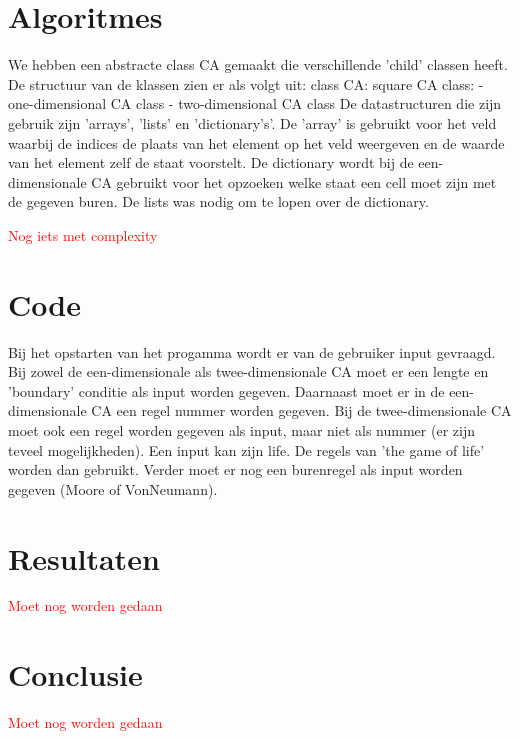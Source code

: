 \documentclass[12pt,a4paper]{article}
\begin{document}
\section*{Algoritmes}
We hebben een abstracte class CA gemaakt die verschillende 'child' classen heeft.
\newline
De structuur van de klassen zien er als volgt uit:
\newline
\phantom{.}class CA:
\newline
\phantom{.}\hspace{12pt}square CA class:
\newline
\phantom{.}\hspace{24pt}- one-dimensional CA class
\newline
\phantom{.}\hspace{24pt}- two-dimensional CA class
\vspace{6pt}
\newline
De datastructuren die zijn gebruik zijn 'arrays', 'lists' en 'dictionary's'. 
De 'array' is gebruikt voor het veld waarbij de indices de plaats van het element op het veld weergeven en 
de waarde van het element zelf de staat voorstelt.
De dictionary wordt bij de een-dimensionale CA gebruikt voor het opzoeken welke staat een cell moet zijn met de gegeven buren.
De lists was nodig om te lopen over de dictionary.

\textcolor{red}{Nog iets met complexity} 

\section*{Code}
Bij het opstarten van het progamma wordt er van de gebruiker input gevraagd.
\newline
Bij zowel de een-dimensionale als twee-dimensionale CA moet 
er een lengte en 'boundary' conditie als input worden gegeven.
Daarnaast moet er in de een-dimensionale CA een regel nummer worden gegeven.
Bij de twee-dimensionale CA moet ook een regel worden gegeven als input, maar niet als nummer (er zijn teveel mogelijkheden).
Een input kan zijn life. De regels van 'the game of life' worden dan gebruikt.
Verder moet er nog een burenregel als input worden gegeven (Moore of VonNeumann).

\section*{Resultaten}
\textcolor{red}{Moet nog worden gedaan}

\section*{Conclusie}
\textcolor{red}{Moet nog worden gedaan}
\end{document}
